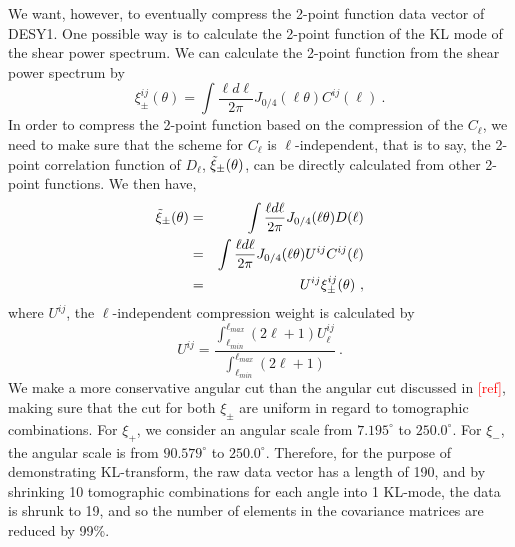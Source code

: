 \documentclass[twocolumn]{\docclass}
\newcommand\be{\begin{equation}}
\newcommand\ee{\end{equation}}
\def\bea{\begin{eqnarray}}
\def\eea{\end{eqnarray}}
\def\svs{\nonumber\\}
\begin{document}
	We want, however, to eventually compress the 2-point function data vector of DESY1. One possible way is to calculate the 2-point function of the KL mode of the shear power spectrum. We can calculate the 2-point function from the shear power spectrum by
	\be
	\xi_{\pm}^{ij}(\theta) = \int \frac{\ell d \ell }{2\pi}J_{0/4}(\ell \theta) C^{ij}(\ell)\
	.\ee
	In order to compress the 2-point function based on the compression of the $C_{\ell}$, we need to make sure that the scheme for $C_{\ell}$ is $\ell$-independent, that is to say, the 2-point correlation function of $D_{\ell}$, $\Tilde{\xi}_{\pm}(\theta)$, can be directly calculated from other 2-point functions. We then have,
	\bea
	\nonumber\Tilde{\xi}_{\pm}(\theta) &=& \int \frac{\ell d \ell }{2\pi}J_{0/4}(\ell \theta) D(\ell)\\\nonumber
	&=&\int \frac{\ell d \ell }{2\pi}J_{0/4}(\ell \theta) U^{ij}C^{ij}(\ell)\\
	&=&U^{ij}\xi_{\pm}^{ij}(\theta)\
	,\eea
	where $U^{ij}$, the $\ell$-independent compression weight is calculated by 
	\be
	U^{ij} = \frac{\int_{\ell _{min}}^{\ell _{max}} (2 \ell +1) U^{ij}_{\ell}}{\int_{\ell _{min}}^{\ell _{max}} (2 \ell +1)}\
	.\ee
	We make a more conservative angular cut than the angular cut discussed in \textcolor{red}{[ref]}, making sure that the cut for both $\xi_{\pm}$ are uniform in regard to tomographic combinations. For $\xi_+$, we consider an angular scale from $7.195^{\circ}$ to $250.0^{\circ}$. For $\xi_-$, the angular scale is from $90.579^{\circ}$ to $250.0^{\circ}$. Therefore, for the purpose of demonstrating KL-transform, the raw data vector has a length of 190, and by shrinking 10 tomographic combinations for each angle into 1 KL-mode, the data is shrunk to 19, and so the number of elements in the covariance matrices are reduced by 99\%.
	
	
\end{document}
